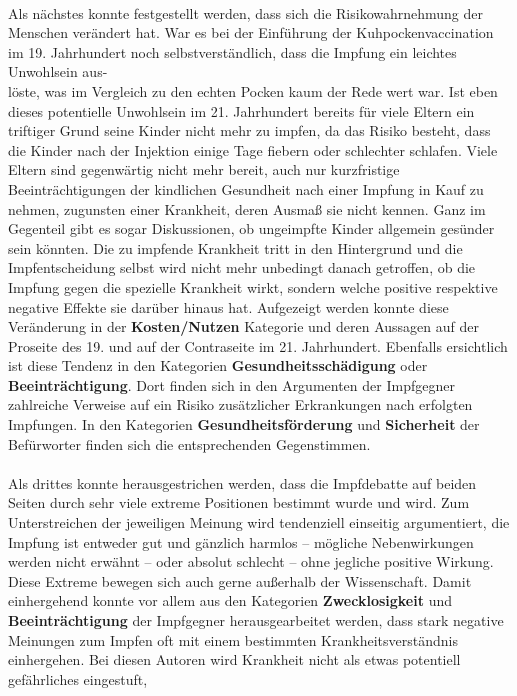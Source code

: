 \documentclass[
    a4paper,
    12pt,
    hyphens,
    chapterprefix=true,
    headheight=33pt,
    footheight=29pt,
    headings=optiontohead, %
]{scrartcl}
\begin{document}
{\\
Als nächstes konnte festgestellt werden, dass sich die Risikowahrnehmung der
Menschen verändert hat. War es bei der Einführung der Kuhpockenvaccination im 19. Jahrhundert noch selbstverständlich, dass die Impfung ein leichtes Unwohlsein aus-\\löste, was im Vergleich zu den echten Pocken kaum der Rede wert war. Ist eben dieses potentielle Unwohlsein im 21. Jahrhundert bereits für viele Eltern ein triftiger Grund seine Kinder nicht mehr zu impfen, da das Risiko besteht, dass die Kinder nach der Injektion einige Tage fiebern oder schlechter schlafen. Viele Eltern sind gegenwärtig nicht mehr bereit, auch nur kurzfristige Beeinträchtigungen der
kindlichen Gesundheit nach einer Impfung in Kauf zu nehmen, zugunsten einer
Krankheit, deren Ausmaß sie nicht kennen. Ganz im Gegenteil gibt es sogar
Diskussionen, ob ungeimpfte Kinder allgemein gesünder sein könnten. Die zu impfende Krankheit tritt in den Hintergrund und die Impfentscheidung selbst wird nicht mehr unbedingt danach getroffen, ob die Impfung gegen die spezielle Krankheit wirkt, sondern welche positive respektive negative Effekte sie darüber hinaus hat. Aufgezeigt werden konnte diese Veränderung in der \textbf{Kosten/Nutzen}
Kategorie und deren Aussagen auf der Proseite des 19. und auf der Contraseite
im 21. Jahrhundert. Ebenfalls ersichtlich ist diese Tendenz in den Kategorien \textbf{Gesundheitsschädigung} oder \textbf{Beeinträchtigung}. Dort finden sich in den Argumenten der Impfgegner zahlreiche Verweise auf ein Risiko zusätzlicher Erkrankungen nach erfolgten Impfungen. In den Kategorien \textbf{Gesundheitsförderung} und \textbf{Sicherheit} der Befürworter finden sich die entsprechenden Gegenstimmen. \\
\\
Als drittes konnte herausgestrichen werden, dass die Impfdebatte auf beiden
Seiten durch sehr viele extreme Positionen bestimmt wurde und wird. Zum
Unterstreichen der jeweiligen Meinung wird tendenziell einseitig
argumentiert, die Impfung ist entweder gut und gänzlich harmlos -- mögliche
Nebenwirkungen werden nicht erwähnt -- oder absolut schlecht -- ohne jegliche
positive Wirkung. Diese Extreme bewegen sich auch gerne außerhalb der
Wissenschaft. Damit einhergehend konnte vor allem aus den Kategorien \textbf{Zwecklosigkeit}
 und \textbf{Beeinträchtigung} der Impfgegner herausgearbeitet werden, dass stark negative Meinungen zum
Impfen oft mit einem bestimmten Krankheitsverständnis einhergehen. Bei diesen
Autoren wird Krankheit nicht als etwas potentiell gefährliches eingestuft,
}
\end{document}
